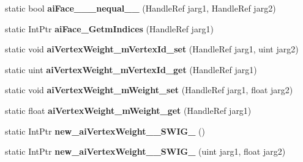 \begin{DoxyCompactItemize}
\item 
\hypertarget{class_assimp_p_i_n_v_o_k_e_afff9fde95ca5ef3777a17758c6704efa}{static bool {\bfseries ai\+Face\+\_\+\+\_\+\+\_\+nequal\+\_\+\+\_\+} (Handle\+Ref jarg1, Handle\+Ref jarg2)}\label{class_assimp_p_i_n_v_o_k_e_afff9fde95ca5ef3777a17758c6704efa}

\item 
\hypertarget{class_assimp_p_i_n_v_o_k_e_a92462fd1c2546a0fc68075482e505203}{static Int\+Ptr {\bfseries ai\+Face\+\_\+\+Getm\+Indices} (Handle\+Ref jarg1)}\label{class_assimp_p_i_n_v_o_k_e_a92462fd1c2546a0fc68075482e505203}

\item 
\hypertarget{class_assimp_p_i_n_v_o_k_e_a0c16ab823d98826d02f25090b8fb7cc7}{static void {\bfseries ai\+Vertex\+Weight\+\_\+m\+Vertex\+Id\+\_\+set} (Handle\+Ref jarg1, uint jarg2)}\label{class_assimp_p_i_n_v_o_k_e_a0c16ab823d98826d02f25090b8fb7cc7}

\item 
\hypertarget{class_assimp_p_i_n_v_o_k_e_ac78ae163ad0b5027e0d778201d9f16c9}{static uint {\bfseries ai\+Vertex\+Weight\+\_\+m\+Vertex\+Id\+\_\+get} (Handle\+Ref jarg1)}\label{class_assimp_p_i_n_v_o_k_e_ac78ae163ad0b5027e0d778201d9f16c9}

\item 
\hypertarget{class_assimp_p_i_n_v_o_k_e_ac1b98dc1d9a951eb49cbe418fc8413f7}{static void {\bfseries ai\+Vertex\+Weight\+\_\+m\+Weight\+\_\+set} (Handle\+Ref jarg1, float jarg2)}\label{class_assimp_p_i_n_v_o_k_e_ac1b98dc1d9a951eb49cbe418fc8413f7}

\item 
\hypertarget{class_assimp_p_i_n_v_o_k_e_a968334af4ebf5fd465ca4b569d01bf6e}{static float {\bfseries ai\+Vertex\+Weight\+\_\+m\+Weight\+\_\+get} (Handle\+Ref jarg1)}\label{class_assimp_p_i_n_v_o_k_e_a968334af4ebf5fd465ca4b569d01bf6e}

\item 
\hypertarget{class_assimp_p_i_n_v_o_k_e_a071e03d13e1d4fe462ab5fb3ce586048}{static Int\+Ptr {\bfseries new\+\_\+ai\+Vertex\+Weight\+\_\+\+\_\+\+S\+W\+I\+G\+\_} ()}\label{class_assimp_p_i_n_v_o_k_e_a071e03d13e1d4fe462ab5fb3ce586048}

\item 
\hypertarget{class_assimp_p_i_n_v_o_k_e_a540b7b5497943555147cc5fd68db004a}{static Int\+Ptr {\bfseries new\+\_\+ai\+Vertex\+Weight\+\_\+\+\_\+\+S\+W\+I\+G\+\_} (uint jarg1, float jarg2)}\label{class_assimp_p_i_n_v_o_k_e_a540b7b5497943555147cc5fd68db004a}


\end{DoxyCompactItemize}
